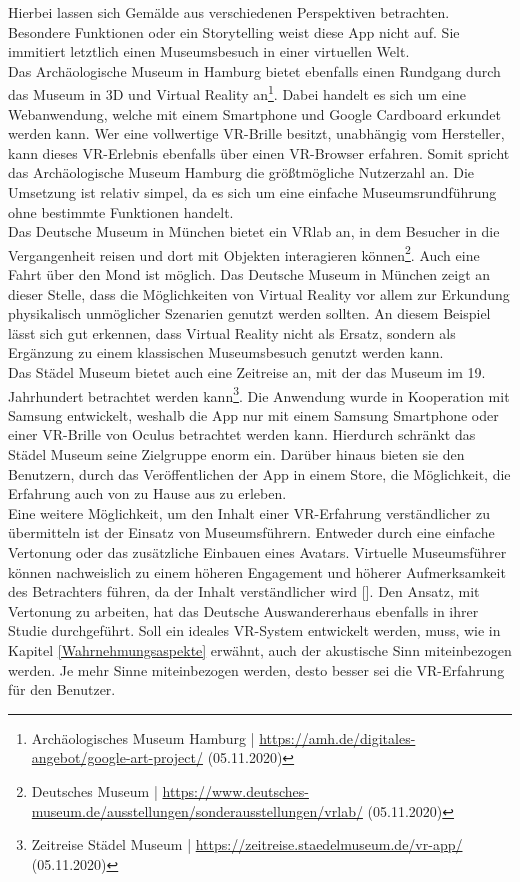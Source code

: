 \documentclass[a4paper,12pt,oneside]{article}
\begin{document}
        Hierbei lassen sich Gemälde aus verschiedenen Perspektiven betrachten.
        Besondere Funktionen oder ein Storytelling weist diese App nicht auf. Sie immitiert
        letztlich einen Museumsbesuch in einer virtuellen Welt. \\
        Das Archäologische Museum in Hamburg bietet ebenfalls einen Rundgang durch
        das Museum in 3D und Virtual Reality an\footnote{Archäologisches Museum Hamburg | \url{https://amh.de/digitales-angebot/google-art-project/} (05.11.2020)}.
        Dabei handelt es sich um eine Webanwendung, welche mit einem Smartphone und
        Google Cardboard erkundet werden kann. Wer eine vollwertige VR-Brille besitzt,
        unabhängig vom Hersteller, kann dieses VR-Erlebnis ebenfalls über einen VR-Browser
        erfahren. Somit spricht das Archäologische Museum Hamburg die größtmögliche 
        Nutzerzahl an.
        Die Umsetzung ist relativ simpel, da es sich um eine einfache Museumsrundführung
        ohne bestimmte Funktionen handelt. \\
        Das Deutsche Museum in München bietet ein VRlab an, in dem Besucher in die Vergangenheit
        reisen und dort mit Objekten interagieren können\footnote{Deutsches Museum | \url{https://www.deutsches-museum.de/ausstellungen/sonderausstellungen/vrlab/} (05.11.2020)}.
        Auch eine Fahrt über den Mond ist möglich. Das Deutsche Museum in München 
        zeigt an dieser Stelle,
        dass die Möglichkeiten von Virtual Reality vor allem zur Erkundung physikalisch unmöglicher
        Szenarien genutzt werden sollten. An 
        diesem Beispiel lässt sich gut erkennen, dass Virtual Reality nicht als Ersatz, sondern
        als Ergänzung zu einem klassischen Museumsbesuch genutzt werden kann. \\
        Das Städel Museum bietet auch eine Zeitreise an, mit der das Museum im 19. Jahrhundert
        betrachtet werden kann\footnote{Zeitreise Städel Museum | \url{https://zeitreise.staedelmuseum.de/vr-app/} (05.11.2020)}.
        Die Anwendung wurde in Kooperation mit Samsung entwickelt, weshalb die App
        nur mit einem Samsung Smartphone oder einer VR-Brille von Oculus betrachtet werden
        kann. Hierdurch schränkt das Städel Museum seine Zielgruppe enorm ein. 
        Darüber hinaus bieten sie den Benutzern, durch das Veröffentlichen der App
        in einem Store, die Möglichkeit, die Erfahrung auch von zu Hause aus zu erleben. \\
        Eine weitere Möglichkeit, um den Inhalt einer VR-Erfahrung verständlicher zu übermitteln
        ist der Einsatz von Museumsführern. Entweder durch eine einfache Vertonung 
        oder das zusätzliche Einbauen eines Avatars. 
        Virtuelle Museumsführer können nachweislich zu einem höheren
        Engagement und höherer Aufmerksamkeit des Betrachters führen, da der Inhalt
        verständlicher wird [\cite[299-300]{Carrozzino2018}].
        Den Ansatz, mit Vertonung zu arbeiten, hat das Deutsche Auswandererhaus ebenfalls in
        ihrer Studie durchgeführt.
        Soll ein ideales VR-System entwickelt werden, muss, wie in Kapitel \ref{Wahrnehmungsaspekte}
        erwähnt, auch der akustische Sinn miteinbezogen werden. Je mehr Sinne miteinbezogen
        werden, desto besser sei die VR-Erfahrung für den Benutzer.
\end{document}

